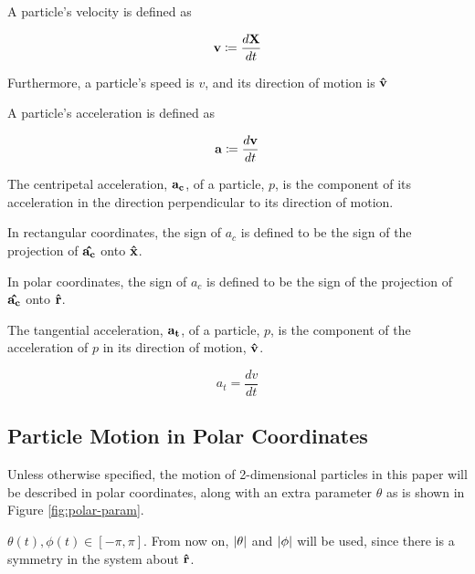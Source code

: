 \begin{definition}
  A particle's velocity is defined as 

  \[\mathbf{v} \coloneqq \frac{d\mathbf{X}}{dt}\]

  Furthermore, a particle's speed is $v$, and its direction of motion is $\mathbf{\hat{v}}$

\end{definition}

\begin{definition}
  A particle's acceleration is defined as 
  
  \[\mathbf{a} \coloneqq \frac{d\mathbf{v}}{dt}\]
\end{definition}

\begin{definition}
  The centripetal acceleration, $\mathbf{a_c}$, of a particle, $p$, is the component of its acceleration in the direction perpendicular to its direction of motion.

  In rectangular coordinates, the sign of $a_c$ is defined to be the sign of the projection of $\mathbf{\hat{a_c}}$ onto $\mathbf{\hat{x}}$. 

  In polar coordinates, the sign of $a_c$ is defined to be the sign of the projection of $\mathbf{\hat{a_c}}$ onto $\mathbf{\hat{r}}$.
\end{definition}

\begin{definition}
  The tangential acceleration, $\mathbf{a_t}$, of a particle, $p$, is the component of the acceleration of $p$ in its direction of motion, $\mathbf{\hat{v}}$.

  \[
  a_t = \frac{dv}{dt}
  \]
\end{definition}


\subsection{Particle Motion in Polar Coordinates}

Unless otherwise specified, the motion of 2-dimensional particles in this paper will be described in polar coordinates, along with an extra parameter $\theta$ as is shown in Figure \ref{fig:polar-param}.


$\theta(t), \phi(t) \in [-\pi, \pi]$. From now on, $\abs{\theta}$ and $\abs{\phi}$ will be used, since there is a symmetry in the system about $\mathbf{\hat{r}}$.

